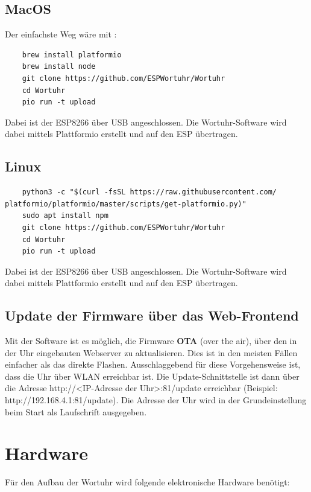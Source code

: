 \documentclass[12pt,a4paper, german,oneside, headinclude, headsepline,plainheadsepline,BCOR20mm, DIV18,parskip=half, openright, numbers=noenddot, captions=tableheading,version=first,listof=totoc,version=first]{scrbook}
\begin{document}
\section{MacOS}

Der einfachste Weg wäre mit :

\begin{lstlisting}
    brew install platformio
    brew install node
    git clone https://github.com/ESPWortuhr/Wortuhr
    cd Wortuhr
    pio run -t upload
\end{lstlisting}

Dabei ist der ESP8266 über USB angeschlossen. Die Wortuhr-Software wird dabei mittels Plattformio erstellt und auf den ESP übertragen.

\section{Linux}

\begin{lstlisting}
    python3 -c "$(curl -fsSL https://raw.githubusercontent.com/ platformio/platformio/master/scripts/get-platformio.py)"
    sudo apt install npm
    git clone https://github.com/ESPWortuhr/Wortuhr
    cd Wortuhr
    pio run -t upload
\end{lstlisting}

Dabei ist der ESP8266 über USB angeschlossen. Die Wortuhr-Software wird dabei mittels Plattformio erstellt und auf den ESP übertragen.

\section{Update der Firmware über das Web-Frontend}
Mit der Software ist es möglich, die Firmware \textbf{OTA} (over the air), über den in der Uhr eingebauten Webserver zu aktualisieren. Dies ist in den meisten Fällen einfacher als das direkte Flashen.
Ausschlaggebend für diese Vorgehensweise ist, dass die Uhr über WLAN erreichbar ist. Die Update-Schnittstelle ist dann über die Adresse
http://<IP-Adresse der Uhr>:81/update erreichbar (Beispiel: http://192.168.4.1:81/update). Die Adresse der Uhr wird in der Grundeinstellung beim Start als Laufschrift ausgegeben.

\chapter{Hardware}

Für den Aufbau der Wortuhr wird folgende elektronische Hardware benötigt:
\end{document}

